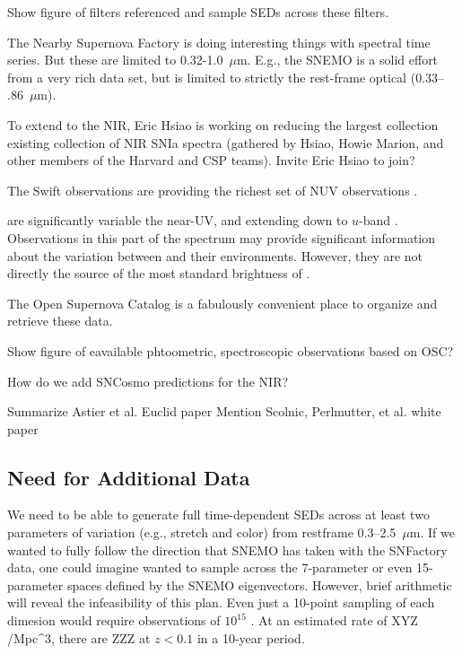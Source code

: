 {\tbd Show figure of filters referenced and sample \snia SEDs across these filters.}

The Nearby Supernova Factory is doing interesting things with spectral time series.  But these are limited to 0.32-1.0~$\mu$m.  
E.g., the SNEMO \citep{Saunders18} is a solid effort from a very rich data set, but is limited to strictly the rest-frame optical ($0.33$--$.86$~$\mu$m).

To extend to the NIR, Eric Hsiao is working on reducing the largest collection existing collection of NIR SNIa spectra (gathered by Hsiao, Howie Marion, and other members of the Harvard and CSP teams).
{\tbd Invite Eric Hsiao to join?}

The Swift \snia observations are providing the richest set of NUV observations \citep{Brown??}.

\sneia are significantly variable the near-UV, and extending down to $u$-band \citep[cf][]{Jha??, Brown??}.  Observations in this part of the spectrum may provide significant information about the variation between \sneia and their environments.  However, they are not directly the source of the most standard brightness of \sneia.

The Open Supernova Catalog \citep{Guillochon17} is a fabulously convenient place to organize and retrieve these data.

{\tbd Show figure of eavailable phtoometric, spectroscopic observations based on OSC?}

{\tbd How do we add SNCosmo predictions for the NIR?}


{\tbd Summarize Astier et al. Euclid paper}
{\tbd Mention Scolnic, Perlmutter, et al. white paper}

\subsection{Need for Additional Data}

We need to be able to generate full time-dependent SEDs across at least two parameters of variation (e.g., stretch and color) from restframe 0.3--2.5~$\mu$m.  If we wanted to fully follow the direction that SNEMO has taken with the SNFactory data, one could imagine wanted to sample across the 7-parameter or even 15-parameter spaces defined by the SNEMO eigenvectors.  However, brief arithmetic will reveal the infeasibility of this plan.  Even just a 10-point sampling of each dimesion would require observations of $10^{15}$ \sneia.  At an estimated rate of XYZ \snia/Mpc^{3}, there are ZZZ \sneia at $z<0.1$ in a 10-year period.

